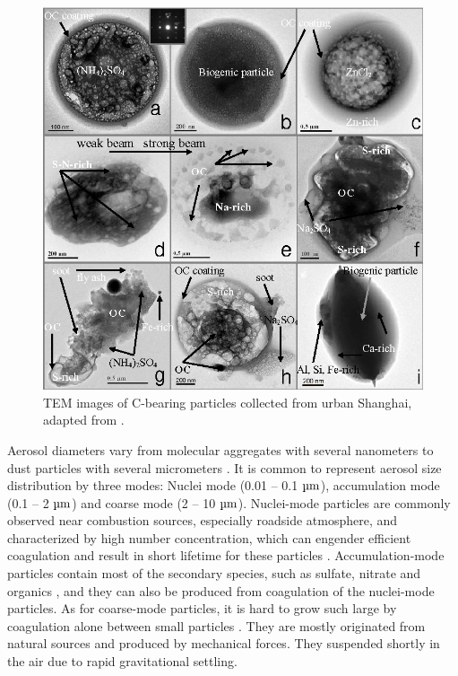 \documentclass[edeposit,fullpage]{uiucthesis2009}
\begin{document}
\begin{figure}
	\centering
	\includegraphics[scale=0.40]{chap1_figs/thesis_chap1_fig2.png}
	\caption{TEM images of C-bearing particles collected from urban Shanghai, adapted from \cite{fu2012morphology}.}
	\label{fig:chap1-mixing}
\end{figure}


Aerosol diameters vary from molecular aggregates with several nanometers to dust particles with several micrometers \citep{MCMURRY200320}. It is common to represent aerosol size distribution by three modes: Nuclei mode (0.01 -- 0.1 $\rm \mu m$), accumulation mode (0.1 -- 2 $\rm \mu m$) and coarse mode (2 -- 10 $ \rm \mu m$). Nuclei-mode particles are commonly observed near combustion sources, especially roadside atmosphere, and characterized by high number concentration, which can engender efficient coagulation and result in short lifetime for these particles \citep{fushimi2008atmospheric}. Accumulation-mode particles contain most of the secondary species, such as sulfate, nitrate and organics \citep{zhang2005time}, and they can also be produced from coagulation of the nuclei-mode particles. As for coarse-mode particles, it is hard to grow such large by coagulation alone between small particles \citep{friedlander1991scavenging, lee2005size}. They are mostly originated from natural sources and produced by mechanical forces. They suspended shortly in the air due to rapid gravitational settling. 
\end{document}
